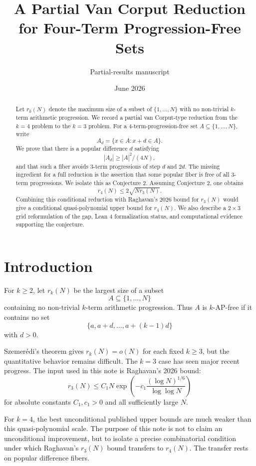 \documentclass[11pt]{article}
\title{A Partial Van Corput Reduction for Four-Term Progression-Free Sets}
\author{Partial-results manuscript}
\date{June 2026}
\begin{document}
\maketitle

\begin{abstract}
Let \(r_k(N)\) denote the maximum size of a subset of \(\{1,\ldots,N\}\) with no
non-trivial \(k\)-term arithmetic progression.  We record a partial van
Corput-type reduction from the \(k=4\) problem to the \(k=3\) problem.  For a
4-term-progression-free set \(A\subseteq\{1,\ldots,N\}\), write
\[
  A_d=\{x\in A:x+d\in A\}.
\]
We prove that there is a popular difference \(d\) satisfying
\[
  |A_d|\geq |A|^2/(4N),
\]
and that such a fiber avoids 3-term progressions of step \(d\) and \(2d\).
The missing ingredient for a full reduction is the assertion that some popular
fiber is free of all 3-term progressions.  We isolate this as Conjecture 2.
Assuming Conjecture 2, one obtains
\[
  r_4(N)\leq 2\sqrt{N r_3(N)}.
\]
Combining this conditional reduction with Raghavan's 2026 bound for \(r_3(N)\)
would give a conditional quasi-polynomial upper bound for \(r_4(N)\).
We also describe a \(2\times3\) grid reformulation of the gap, Lean 4
formalization status, and computational evidence supporting the conjecture.
\end{abstract}

\tableofcontents

\section{Introduction}

For \(k\geq 2\), let \(r_k(N)\) be the largest size of a subset
\[
  A\subseteq \{1,\ldots,N\}
\]
containing no non-trivial \(k\)-term arithmetic progression.  Thus \(A\) is
\(k\)-AP-free if it contains no set
\[
  \{a,a+d,\ldots,a+(k-1)d\}
\]
with \(d>0\).

Szemerédi's theorem gives \(r_k(N)=o(N)\) for each fixed \(k\geq 3\), but the
quantitative behavior remains difficult.  The \(k=3\) case has seen major
recent progress.  The input used in this note is Raghavan's 2026 bound:
\[
  r_3(N)
  \leq
  C_1 N
  \exp\!\left(
    -c_1\frac{(\log N)^{1/6}}{\log\log N}
  \right)
\]
for absolute constants \(C_1,c_1>0\) and all sufficiently large \(N\).

For \(k=4\), the best unconditional published upper bounds are much weaker than
this quasi-polynomial scale.  The purpose of this note is not to claim an
unconditional improvement, but to isolate a precise combinatorial condition
under which Raghavan's \(r_3(N)\) bound transfers to \(r_4(N)\).  The transfer
rests on popular difference fibers.
\end{document}
